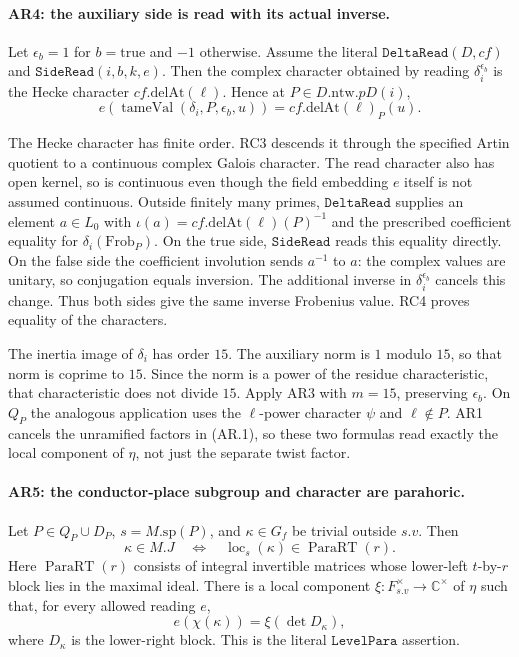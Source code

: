 \paragraph{AR4: the auxiliary side is read with its actual inverse.}
Let $\epsilon_b=1$ for $b=\mathrm{true}$ and $-1$ otherwise.
Assume the literal $\texttt{DeltaRead}(D,cf)$ and
$\texttt{SideRead}(i,b,k,e)$. Then the complex character obtained by
reading $\delta_i^{\epsilon_b}$ is the Hecke character
$cf.\mathrm{delAt}(\ell)$. Hence at $P\in D.\mathrm{ntw}.pD(i)$,
\[
 e\!\left(\operatorname{tameVal}(\delta_i,P,\epsilon_b,u)\right)
       =cf.\mathrm{delAt}(\ell)_P(u).                   \tag{AR.5}
\]

The Hecke character has finite order. RC3 descends it through the
specified Artin quotient to a continuous complex Galois character.
The read character also has open kernel, so is continuous even though
the field embedding $e$ itself is not assumed continuous.
Outside finitely many primes, $\texttt{DeltaRead}$ supplies an element
$a\in L_0$ with
$\iota(a)=cf.\mathrm{delAt}(\ell)(P)^{-1}$ and the prescribed
coefficient equality for $\delta_i(\mathrm{Frob}_P)$.
On the true side, $\texttt{SideRead}$ reads this equality directly.
On the false side the coefficient involution sends $a^{-1}$ to $a$:
the complex values are unitary, so conjugation equals inversion.
The additional inverse in $\delta_i^{\epsilon_b}$ cancels this change.
Thus both sides give the same inverse Frobenius value. RC4 proves
equality of the characters.

The inertia image of $\delta_i$ has order $15$. The auxiliary norm is
$1$ modulo $15$, so that norm is coprime to $15$. Since the norm
is a power of the residue characteristic, that characteristic
does not divide $15$. Apply AR3 with $m=15$, preserving $\epsilon_b$.
On $Q_P$ the analogous application uses the $\ell$-power character
$\psi$ and $\ell\notin P$. AR1 cancels the unramified factors in
(AR.1), so these two formulas read exactly the local component of
$\eta$, not just the separate twist factor.

\paragraph{AR5: the conductor-place subgroup and character are parahoric.}
Let $P\in Q_P\cup D_P$, $s=M.\mathrm{sp}(P)$, and
$\kappa\in G_f$ be trivial outside $s.v$. Then
\[
 \kappa\in M.J
 \quad\Longleftrightarrow\quad
 \operatorname{loc}_s(\kappa)\in\operatorname{ParaRT}(r).
                                                               \tag{AR.6}
\]
Here $\operatorname{ParaRT}(r)$ consists of integral invertible matrices
whose lower-left $t$-by-$r$ block lies in the maximal ideal.
There is a local component $\xi:F_{s.v}^{\times}\to\mathbb C^\times$
of $\eta$ such that, for every allowed reading $e$,
\[
 e(\chi(\kappa))=\xi(\det D_\kappa),                     \tag{AR.7}
\]
where $D_\kappa$ is the lower-right block. This is the literal
$\texttt{LevelPara}$ assertion.

